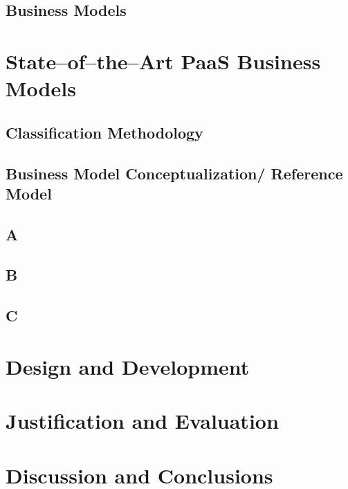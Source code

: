 	\section{Business Models}

\chapter{State--of--the--Art PaaS Business Models}

	\section{Classification Methodology}

	\section{Business Model Conceptualization/ Reference Model}
	
	\section{A}
	\section{B}
	\section{C}

\chapter{Design and Development}


\chapter{Justification and Evaluation}

\chapter{Discussion and Conclusions}


